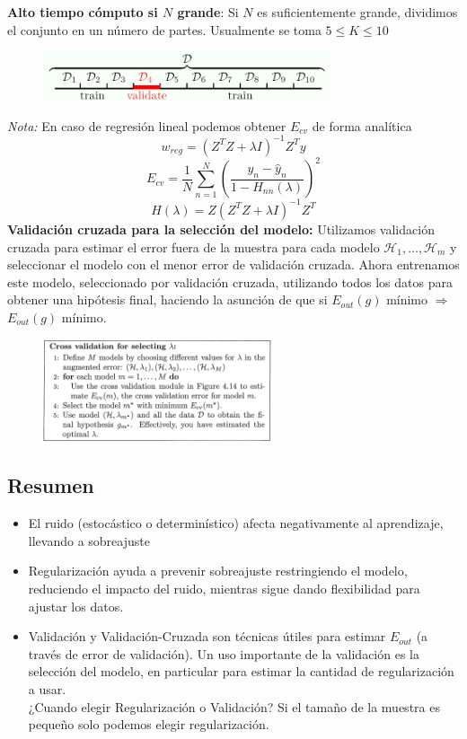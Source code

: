 \documentclass[11pt,a4paper]{article}
\theoremstyle{definition}
\begin{document}
	\textbf{Alto tiempo cómputo si $N$ grande}: Si $N$ es suficientemente grande, dividimos el conjunto en un número de partes. Usualmente se toma $5\leq K \leq 10$
	\begin{figure}[H]
		\centering
		\includegraphics[width=0.75\textwidth]{images/cross_val_part}
		\caption{}
	\end{figure}
	\textit{Nota:} En caso de regresión lineal podemos obtener $E_{cv}$ de forma analítica
	$$w_{reg}=(Z^TZ+\lambda I)^{-1}Z^Ty$$
	$$E_{cv}=\frac{1}{N}\sum_{n=1}^N\left( \frac{y_n -\hat y_n}{1-H_{nn}(\lambda)}\right)^2$$
	$$H(\lambda ) =Z(Z^TZ+\lambda I)^{-1}Z^T$$
	\textbf{Validación cruzada para la selección del modelo:} Utilizamos validación cruzada para estimar el error fuera de la muestra para cada modelo $\mathcal{H}_1,\ldots, \mathcal{H}_m$ y seleccionar el modelo con el menor error de validación cruzada. Ahora entrenamos este modelo, seleccionado por validación cruzada, utilizando todos los datos para obtener una hipótesis final, haciendo la asunción de que si $E_{out}(g)$ mínimo $\Rightarrow $ $E_{out}(g)$ mínimo.
	\begin{figure}[H]
		\centering
		\includegraphics[width=0.6\textwidth]{images/cross_val_lambda}
		\caption{}
	\end{figure}
	\subsection{Resumen}
	\begin{itemize}
		\item El ruido (estocástico o determinístico) afecta negativamente al aprendizaje, llevando a sobreajuste
		\item Regularización ayuda a prevenir sobreajuste restringiendo el modelo, reduciendo el impacto del ruido, mientras sigue dando flexibilidad para ajustar los datos.
		\item Validación y Validación-Cruzada son técnicas útiles para estimar $E_{out}$ (a través de error de validación). Un uso importante de la validación es la selección del modelo, en particular para estimar la cantidad de regularización a usar.\\
		¿Cuando elegir Regularización o Validación? Si el tamaño de la muestra es pequeño solo podemos elegir regularización.
	\end{itemize}
\end{document}
